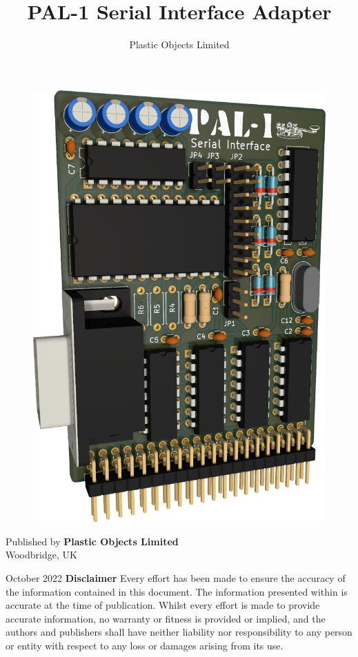 \documentclass[a4paper,11pt,twoside,openright]{report}
\title{PAL-1 Serial Interface Adapter}
\author{Plastic Objects Limited}
\date{}
\newcommand\frontmatter{
  \cleardoublepage
  \pagenumbering{roman}}
\begin{document}
\frontmatter
\begin{titlepage}
\begin{figure}[t]
\centering
\includegraphics[scale=0.25]{figures/serial.png}
\end{figure}
\maketitle
\end{titlepage}
\clearpage
\noindent Published by \textbf{Plastic Objects Limited} \\
Woodbridge, UK

\bigskip
\noindent October 2022
\vfill
{\noindent\Large\textbf{Disclaimer}}
\vskip 6pt
Every effort has been made to ensure the accuracy of the information contained in this document. The information presented within is accurate at the time of publication. Whilst every effort is made to provide accurate information, no warranty or fitness is provided or implied, and the authors and publishers shall have neither liability nor responsibility to any person or entity with respect to any loss or damages arising from its use.
\end{document}
